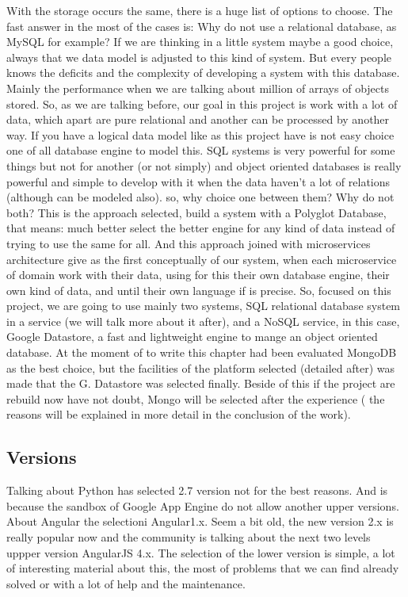 With the storage occurs the same, there is a huge list of options to
choose. The fast answer in the most of the cases is: Why do not use a relational
database, as MySQL for example? If we are thinking in a little system maybe a
good choice, always that we data model is adjusted to this kind of system. But
every people knows the deficits and the complexity of developing a system
with this database. Mainly the performance when we are talking about million
of arrays of objects stored. So, as we are talking before, our goal in this project
is work with a lot of data, which apart are pure relational and another can be
processed by another way.
\intro
If you have a logical data model like as this project have is not easy choice one
of all database engine to model this. SQL systems is very powerful for some
things but not for another (or not simply) and object oriented databases is
really powerful and simple to develop with it when the data haven't a lot of
relations (although can be modeled also).
so, why choice one between them? Why do not both? This is the approach selected,
build a system with a Polyglot Database, that means: much better select the better
engine for any kind of data instead of trying to use the same for all.
\intro
And this approach joined with microservices architecture give as the first
conceptually of our system, when each microservice of domain work with their
data, using for this their own database engine, their own kind of data, and
until their own language if is precise.
\intro
So, focused on this project, we are going to use mainly two systems, SQL
relational database system in a service (we will talk more about it after),
and a NoSQL service, in this case, Google Datastore, a fast and lightweight
engine to mange an object oriented database.
\intro
At the moment of to write this chapter had been evaluated MongoDB as the best
choice, but the facilities of the platform selected (detailed after) was made
that the G. Datastore was selected finally. Beside of this if the project are
rebuild now have not doubt, Mongo will be selected after the experience ( the
reasons will be explained in more detail in the conclusion of the work).

\subsection{Versions}

Talking about Python has selected 2.7 version not for the best reasons.
And is because the sandbox of Google App Engine do not allow another upper versions.
\intro
About Angular the selectioni Angular1.x. Seem a bit old, the new version 2.x
is really popular now and the community is talking about the next two levels
uppper version AngularJS 4.x.
\intro
The selection of the lower version is simple, a lot of interesting material
about this, the most of problems that we can find already solved or with a lot
of help and the maintenance.

